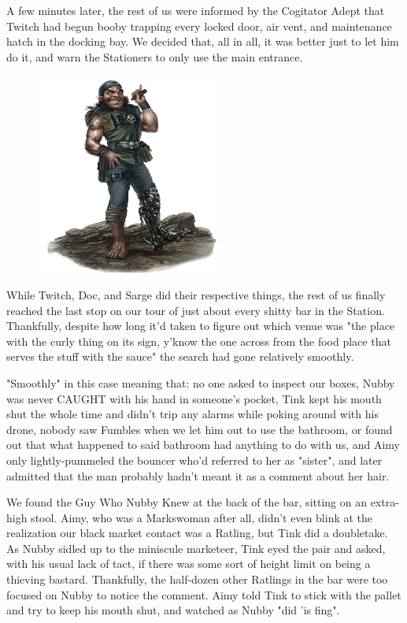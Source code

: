 A few minutes later, the rest of us were informed by the Cogitator Adept that Twitch had begun booby trapping every locked door, air vent, and maintenance hatch in the docking bay. 
We decided that, all in all, it was better just to let him do it, and warn the Stationers to only use the main entrance.

\begin{figure}
	\begin{center}
		\includegraphics[width=\figwidth]{pics/14/17.png}
	\end{center}
\end{figure}
While Twitch, Doc, and Sarge did their respective things, the rest of us finally reached the last stop on our tour of just about every shitty bar in the Station. 
Thankfully, despite how long it'd taken to figure out which venue was "the place with the curly thing on its sign, y'know the one across from the food place that serves the stuff with the sauce" the search had gone relatively smoothly. 


"Smoothly" in this case meaning that: 
no one asked to inspect our boxes, Nubby was never CAUGHT with his hand in someone's pocket, Tink kept his mouth shut the whole time and didn't trip any alarms while poking around with his drone, nobody saw Fumbles when we let him out to use the bathroom, or found out that what happened to said bathroom had anything to do with us, and Aimy only lightly-pummeled the bouncer who'd referred to her as "sister", and later admitted that the man probably hadn't meant it as a comment about her hair.

We found the Guy Who Nubby Knew at the back of the bar, sitting on an extra-high stool. 
Aimy, who was a Markswoman after all, didn't even blink at the realization our black market contact was a Ratling, but Tink did a doubletake. 
As Nubby sidled up to the miniscule marketeer, Tink eyed the pair and asked, with his usual lack of tact, if there was some sort of height limit on being a thieving bastard. 
Thankfully, the half-dozen other Ratlings in the bar were too focused on Nubby to notice the comment. 
Aimy told Tink to stick with the pallet and try to keep his mouth shut, and watched as Nubby "did 'is fing".

